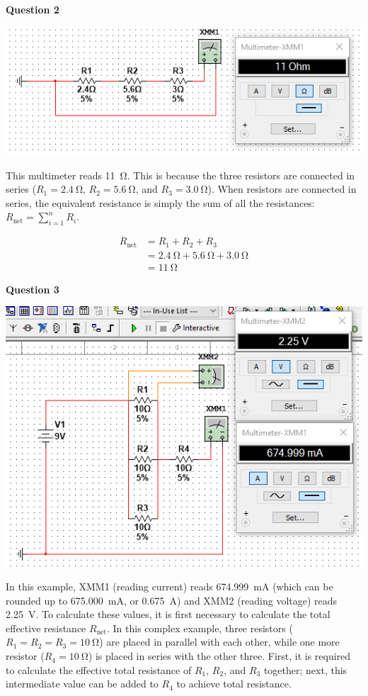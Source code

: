 \documentclass{article}
\begin{document}
\pagebreak

\textbf{Question 2}

\includegraphics[width=\textwidth]{Lab3Screenshot2.png}

This multimeter reads \SI{11}{\ohm}. This is because the three resistors are
connected in series
    ($R_1 = \SI{2.4}{\ohm}$,
    $R_2 = \SI{5.6}{\ohm}$, and
    $R_3 = \SI{3.0}{\ohm}$).
When resistors are connected in series, the equivalent resistance is simply
the sum of all the resistances: $R_{\text{net}} = \sum_{i=1}^n R_i$.

\begin{align*}
    R_{\text{net}} &= R_1 + R_2 + R_3\\ 
    &= \SI{2.4}{\ohm} + \SI{5.6}{\ohm} + \SI{3.0}{\ohm}\\ 
    &= \SI{11}{\ohm}
\end{align*}

\textbf{Question 3}

\includegraphics[width=\textwidth]{Lab3Screenshot3.png}

In this example, XMM1 (reading current) reads \SI{674.999}{\milli\ampere} (which
can be rounded up to \SI{675.000}{\milli\ampere}, or \SI{0.675}{\ampere})
and XMM2 (reading voltage) reads \SI{2.25}{\volt}.
To calculate these values, it is first necessary
to calculate the total effective resistance $R_{\text{net}}$. In this complex
example, three resistors ($R_1 = R_2 = R_3 = \SI{10}{\ohm}$) are placed in
parallel with each other, while one more resistor ($R_4 = \SI{10}{\ohm}$) is
placed in series with the other three. First, it is required to calculate the
effective total resistance of $R_1$, $R_2$, and $R_3$ together; next, this
intermediate value can be added to $R_4$ to achieve total resistance.
\end{document}

